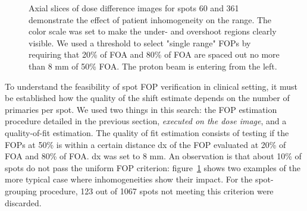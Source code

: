 \documentclass[a4paper,english]{article}
\begin{document}
\begin{figure}[htp]
  \captionsetup[subfigure]{labelformat=empty}
  \centering
  \quad\quad\quad
  \caption{Axial slices of dose difference images for spots 60 and 361 demonstrate the effect of patient inhomogeneity on the range. The color scale was set to make the under- and overshoot regions clearly visible. We used a threshold to select "single range" FOPs by requiring that 20\% of FOA and 80\% of FOA are spaced out no more than 8 mm of 50\% FOA. The proton beam is entering from the left.}
  \label{fig:no-single-range}
\end{figure}

To understand the feasibility of spot FOP verification in clinical setting, it must be established how the quality of the shift estimate depends on the number of primaries per spot. We used two things in this search: the FOP estimation procedure detailed in the previous section, \emph{executed on the dose image}, and a quality-of-fit estimation. The quality of fit estimation consists of testing if the FOPs at 50\% is within a certain distance dx of the FOP evaluated at 20\% of FOA and 80\% of FOA. dx was set to 8 mm. An observation is that about 10\% of spots do not pass the uniform FOP criterion: figure~\ref{fig:no-single-range} shows two examples of the more typical case where inhomogeneities show their impact. For the spot-grouping procedure, 123 out of 1067 spots not meeting this criterion were discarded.
\end{document}
